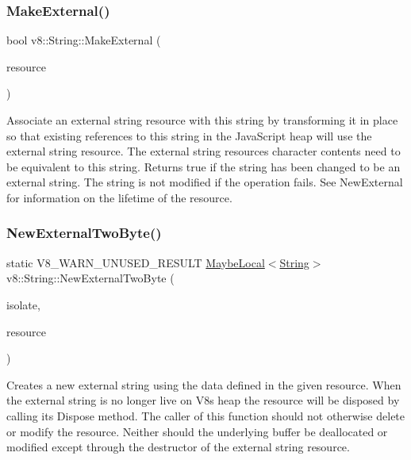 \subsubsection{\texorpdfstring{Make\+External()}{MakeExternal()}\hspace{0.1cm}{\footnotesize\ttfamily [2/2]}}
{\footnotesize\ttfamily bool v8\+::\+String\+::\+Make\+External (\begin{DoxyParamCaption}\item[{\mbox{\hyperlink{classv8_1_1String_1_1ExternalOneByteStringResource}{External\+One\+Byte\+String\+Resource}} $\ast$}]{resource }\end{DoxyParamCaption})}

Associate an external string resource with this string by transforming it in place so that existing references to this string in the Java\+Script heap will use the external string resource. The external string resource\textquotesingle{}s character contents need to be equivalent to this string. Returns true if the string has been changed to be an external string. The string is not modified if the operation fails. See New\+External for information on the lifetime of the resource. \mbox{\label{classv8_1_1String_ad0491e4a3506df9ef9bfc08fca0d7a34}} 
\subsubsection{\texorpdfstring{New\+External\+Two\+Byte()}{NewExternalTwoByte()}}
{\footnotesize\ttfamily static V8\+\_\+\+W\+A\+R\+N\+\_\+\+U\+N\+U\+S\+E\+D\+\_\+\+R\+E\+S\+U\+LT \mbox{\hyperlink{classv8_1_1MaybeLocal}{Maybe\+Local}}$<$\mbox{\hyperlink{classv8_1_1String}{String}}$>$ v8\+::\+String\+::\+New\+External\+Two\+Byte (\begin{DoxyParamCaption}\item[{Isolate $\ast$}]{isolate,  }\item[{\mbox{\hyperlink{classv8_1_1String_1_1ExternalStringResource}{External\+String\+Resource}} $\ast$}]{resource }\end{DoxyParamCaption})\hspace{0.3cm}{\ttfamily [static]}}

Creates a new external string using the data defined in the given resource. When the external string is no longer live on V8\textquotesingle{}s heap the resource will be disposed by calling its Dispose method. The caller of this function should not otherwise delete or modify the resource. Neither should the underlying buffer be deallocated or modified except through the destructor of the external string resource. \mbox{\label{classv8_1_1String_a2b8cf518523a62d97360c07ed33d8aa6}} 

